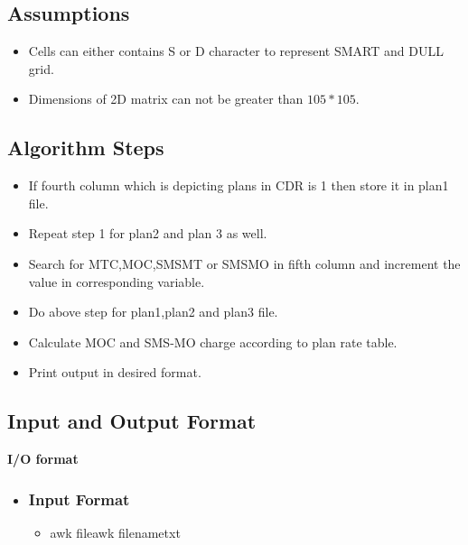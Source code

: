 \documentclass[11pt]{article}
\begin{document}
\subsection{Assumptions}
{
\begin{itemize}
\item Cells can either contains S or D character to represent SMART and DULL grid.
\item Dimensions of 2D matrix can not be greater than $105*105$.
\end{itemize}
}




\subsection{Algorithm Steps}
{
\begin{itemize}
\item If fourth column which is depicting plans in CDR is 1 then store it in plan1 file.
\item Repeat step 1 for plan2 and plan 3 as well.
\end{itemize}
\begin{itemize}
\item Search for MTC,MOC,SMSMT or SMSMO in fifth column and increment the value in corresponding variable.
\item Do above step for plan1,plan2 and plan3 file.
\end{itemize}
\begin{itemize}
\item Calculate MOC and SMS-MO charge according to plan rate table.
\item Print output in desired format.
\end{itemize}





\subsection{Input and Output Format}
{


\textbf{I/O format} 
\begin{itemize}
\item \subsubsection{Input Format}
\begin{itemize}
\item awk fileawk filenametxt 
\end{itemize}


\end{itemize}}}
\end{document}
